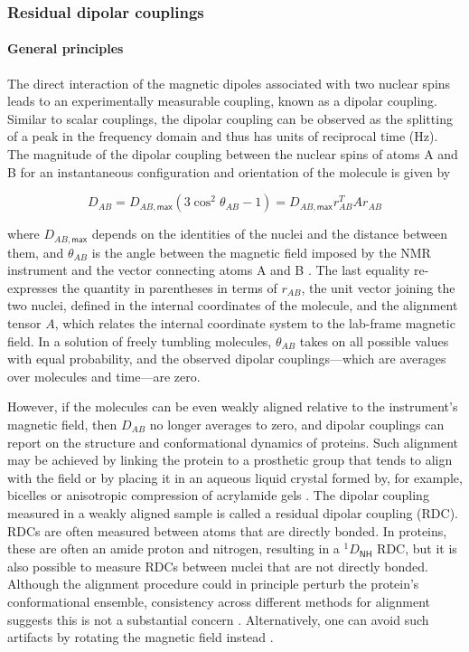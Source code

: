\documentclass[9pt,review]{livecoms}
\begin{document}
\subsubsection{Residual dipolar couplings}

\paragraph{General principles}

The direct interaction of the magnetic dipoles associated with two nuclear spins leads to an experimentally measurable coupling, known as a dipolar coupling.
Similar to scalar couplings, the dipolar coupling can be observed as the splitting of a peak in the frequency domain and thus has units of reciprocal time (Hz).
The magnitude of the dipolar coupling between the nuclear spins of atoms A and B for an instantaneous configuration and orientation of the molecule is given by

\begin{equation}
\label{eqn:rdc}
D_{AB} = D_{AB,\mathsf{max}} \left( 3 \cos^2 \theta_{AB} - 1 \right) = D_{AB,\mathsf{max}} r_{AB}^T A r_{AB}
\end{equation}

\noindent where $D_{AB,\mathsf{max}}$ depends on the identities of the nuclei and the distance between them, and $\theta_{AB}$ is the angle between the magnetic field imposed by the NMR instrument and the vector connecting atoms A and B \cite{bax2001dipolar,bax2003weak,chiliveri2021advances}.
The last equality re-expresses the quantity in parentheses in terms of $r_{AB}$, the unit vector joining the two nuclei, defined in the internal coordinates of the molecule, and the alignment tensor $A$, which relates the internal coordinate system to the lab-frame magnetic field.
In a solution of freely tumbling molecules, $\theta_{AB}$ takes on all possible values with equal probability, and the observed dipolar couplings---which are averages over molecules and time---are zero.

However, if the molecules can be even weakly aligned relative to the instrument’s magnetic field, then $D_{AB}$ no longer averages to zero, and dipolar couplings can report on the structure and conformational dynamics of proteins.
Such alignment may be achieved by linking the protein to a prosthetic group that tends to align with the field or by placing it in an aqueous liquid crystal formed by, for example, bicelles \cite{sanders_magnetically_1990,prosser_magnetically_1998} or anisotropic compression of acrylamide gels \cite{tycko_alignment_2000}.
The dipolar coupling measured in a weakly aligned sample is called a residual dipolar coupling (RDC).
RDCs are often measured between atoms that are directly bonded.
In proteins, these are often an amide proton and nitrogen, resulting in a $^1D_{\mathsf{NH}}$ RDC, but it is also possible to measure RDCs between nuclei that are not directly bonded.
Although the alignment procedure could in principle perturb the protein’s conformational ensemble, consistency across different methods for alignment suggests this is not a substantial concern \cite{lakomek2008self}.
Alternatively, one can avoid such artifacts by rotating the magnetic field instead \cite{pechlaner_molecular_2024}.
\end{document}
